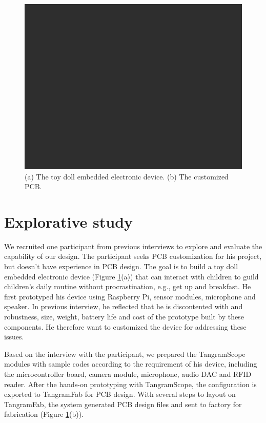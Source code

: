 \begin{figure}[tb]
  \centering
  \includegraphics[width=1\columnwidth]{image/tan/space1.png}
  \caption{(a) The toy doll embedded electronic device. (b) The customized PCB.}\label{fig:study}
\end{figure}

\section{Explorative study}
We recruited one participant from previous interviews to explore and evaluate the capability of our design.
The participant seeks PCB customization for his project, but doesn't have experience in PCB design.
The goal is to build a toy doll \cite{Wakey:2017} embedded electronic device (Figure \ref{fig:study}(a)) that can interact with children to guild children's daily routine without procrastination, e.g., get up and breakfast.
He first prototyped his device using Raspberry Pi, sensor modules, microphone and  speaker.
In previous interview, he reflected that he is discontented with and robustness, size, weight, battery life and cost of the prototype built by these components.
He therefore want to customized the device for addressing these issues.

Based on the interview with the participant, we prepared the TangramScope modules with sample codes according to the requirement of his device, including the microcontroller board, camera module, microphone, audio DAC and RFID reader.
After the hands-on prototyping with TangramScope, the configuration is exported to TangramFab for PCB design.
With several steps to layout on TangramFab, the system generated PCB design files and sent to factory for fabrication (Figure \ref{fig:study}(b)).

